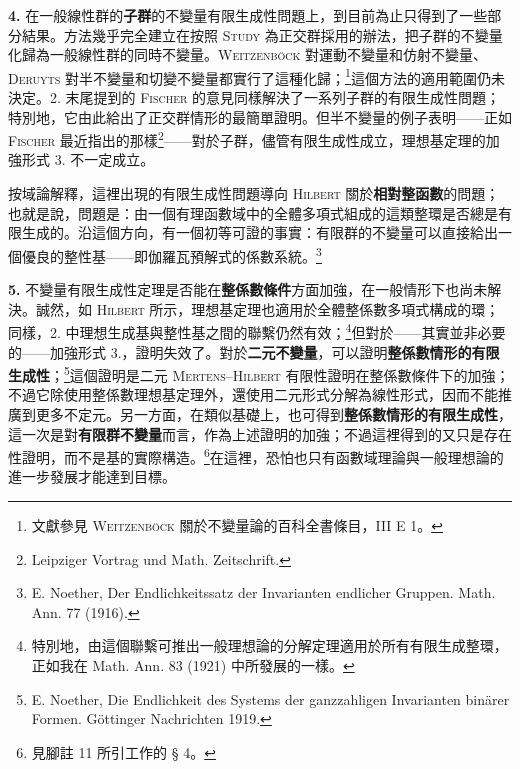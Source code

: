 \documentclass[11pt]{article}
\newcommand{\srcemph}[1]{\textbf{#1}}
\newcommand{\srcname}[1]{\textsc{#1}}
\begin{document}
\textbf{4.} 在一般線性群的\srcemph{子群}的不變量有限生成性問題上，到目前為止只得到了一些部分結果。方法幾乎完全建立在按照 \srcname{Study} 為正交群採用的辦法，把子群的不變量化歸為一般線性群的同時不變量。\srcname{Weitzenböck} 對運動不變量和仿射不變量、\srcname{Deruyts} 對半不變量和切變不變量都實行了這種化歸；\footnote{文獻參見 \textsc{Weitzenböck} 關於不變量論的百科全書條目，III E 1。}這個方法的適用範圍仍未決定。2. 末尾提到的 \srcname{Fischer} 的意見同樣解決了一系列子群的有限生成性問題；特別地，它由此給出了正交群情形的最簡單證明。但半不變量的例子表明——正如 \srcname{Fischer} 最近指出的那樣\footnote{Leipziger Vortrag und Math. Zeitschrift.}——對於子群，儘管有限生成性成立，理想基定理的加強形式 3. 不一定成立。

按域論解釋，這裡出現的有限生成性問題導向 \srcname{Hilbert} 關於\srcemph{相對整函數}的問題；也就是說，問題是：由一個有理函數域中的全體多項式組成的這類整環是否總是有限生成的。沿這個方向，有一個初等可證的事實：有限群的不變量可以直接給出一個優良的整性基——即伽羅瓦預解式的係數系統。\footnote{E. Noether, Der Endlichkeitssatz der Invarianten endlicher Gruppen. Math. Ann. 77 (1916).}

\textbf{5.} 不變量有限生成性定理是否能在\srcemph{整係數條件}方面加強，在一般情形下也尚未解決。誠然，如 \srcname{Hilbert} 所示，理想基定理也適用於全體整係數多項式構成的環；同樣，2. 中理想生成基與整性基之間的聯繫仍然有效；\footnote{特別地，由這個聯繫可推出一般理想論的分解定理適用於所有有限生成整環，正如我在 Math. Ann. 83 (1921) 中所發展的一樣。}但對於——其實並非必要的——加強形式 3.，證明失效了。對於\srcemph{二元不變量}，可以證明\srcemph{整係數情形的有限生成性}；\footnote{E. Noether, Die Endlichkeit des Systems der ganzzahligen Invarianten binärer Formen. Göttinger Nachrichten 1919.}這個證明是二元 \srcname{Mertens--Hilbert} 有限性證明在整係數條件下的加強；不過它除使用整係數理想基定理外，還使用二元形式分解為線性形式，因而不能推廣到更多不定元。另一方面，在類似基礎上，也可得到\srcemph{整係數情形的有限生成性}，這一次是對\srcemph{有限群不變量}而言，作為上述證明的加強；不過這裡得到的又只是存在性證明，而不是基的實際構造。\footnote{見腳註 11 所引工作的 § 4。}在這裡，恐怕也只有函數域理論與一般理想論的進一步發展才能達到目標。
\end{document}
